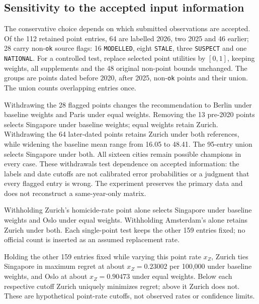 \subsection{Sensitivity to the accepted input information}\label{sec:sourcepolicy}
The conservative choice depends on which submitted observations are accepted.
Of the 112 retained point entries, 64 are labelled 2026, two 2025 and 46 earlier;
28 carry non-\texttt{ok} source flags: 16 \texttt{MODELLED}, eight \texttt{STALE},
three \texttt{SUSPECT} and one \texttt{NATIONAL}.
For a controlled test, replace selected point utilities by $[0,1]$, keeping
weights, all supplements and the 48 original non-point bounds unchanged.
The groups are points dated before 2020, after 2025, non-\texttt{ok} points and
their union. The union counts overlapping entries once.



Withdrawing the 28 flagged points changes the recommendation to Berlin under
baseline weights and Paris under equal weights. Removing the 13 pre-2020 points
selects Singapore under baseline weights; equal weights retain Zurich.
Withdrawing the 64 later-dated points retains Zurich under both references,
while widening the baseline mean range from 16.05 to 48.41. The 95-entry union
selects Singapore under both. All sixteen cities remain possible champions
in every case. These withdrawals test dependence on accepted information:
the labels and date cutoffs are not calibrated error probabilities or a
judgment that every flagged entry is wrong. The experiment preserves the
primary data and does not reconstruct a same-year-only matrix.

Withholding Zurich's homicide-rate point alone selects Singapore under baseline
weights and Oslo under equal weights. Withholding Amsterdam's alone retains
Zurich under both. Each single-point test keeps the other 159 entries fixed;
no official count is inserted as an assumed replacement rate.

Holding the other 159 entries fixed while varying this point rate $x_Z$, Zurich ties Singapore in maximum regret at about $x_Z=0.23002$ per 100,000 under baseline weights, and Oslo at about $x_Z=0.90473$ under equal weights. Below each respective cutoff Zurich uniquely minimizes regret; above it Zurich does not. These are hypothetical point-rate cutoffs, not observed rates or confidence limits.

